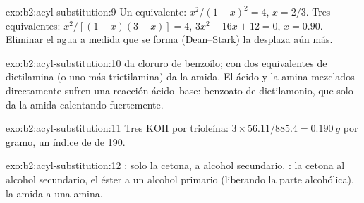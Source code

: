 \begin{solution}{exo:b2:acyl-substitution:9}
Un equivalente: $x^2/(1 - x)^2 = 4$, $x = 2/3$. Tres equivalentes: $x^2/[(1 - x)(3 - x)] = 4$, $3x^2 - 16x
+ 12 = 0$, $x = 0.90$. Eliminar el agua a medida que se forma (Dean--Stark) la desplaza aún más.
\end{solution}

\begin{solution}{exo:b2:acyl-substitution:10}
 da cloruro de benzoílo; con dos equivalentes de dietilamina (o uno más trietilamina)
da la amida. El ácido y la amina mezclados directamente sufren una reacción ácido--base: benzoato de
dietilamonio, que solo da la amida calentando fuertemente.
\end{solution}

\begin{solution}{exo:b2:acyl-substitution:11}
Tres KOH por trioleína: $3 \times 56.11/885.4 = \qty{0.190}{g}$ por gramo, un índice de  de
190.
\end{solution}

\begin{solution}{exo:b2:acyl-substitution:12}
: solo la cetona, a alcohol secundario. : la cetona al alcohol
secundario, el éster a un alcohol primario (liberando la parte alcohólica), la amida a una amina.
\end{solution}

